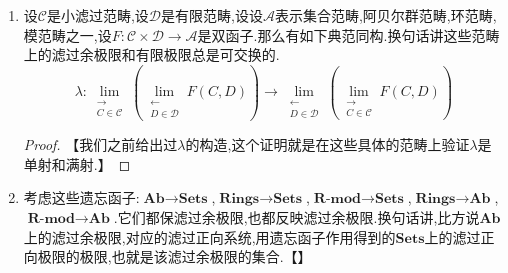 \begin{enumerate}
\begin{proof}
    	我们先来验证这里$\sim$的确是一个等价关系.首先自反性和对称性是容易的,下面解释传递性.设$(x_1\in F_1)\sim(x_2\in F_2)$和$(x_2\in F_2)\sim(x_3\in F_3)$.那么存在$\mathscr{I}$中的对象4和5,以及态射$f:1\to4$,$g:2t\to4$,$h:2\to5$,$k:3\to5$,使得有$Ff(x_1)=Fg(x_2)$和$Fh(x_2)=Fk(x_3)$.那么按照上述引理,存在余锥$\{\alpha_i:i\to6\mid 1\le i\le 5\}$,于是我们有如下交换图表:
    	$$\xymatrix{&&6&&\\&4\ar[ur]^{\alpha_4}&&5\ar[ul]_{\alpha_5}&\\1\ar[ur]^f&&2\ar[ul]^g\ar[ur]_h\ar[uu]_{\alpha_2}&&3\ar[ul]_k}$$
    	
    	于是有:
    	\begin{align*}
    		F\alpha_4\circ Ff(x_1)&=F\alpha_4\circ Fg(x_2)\\&=F\alpha_2(x_2)\\&=F\alpha_5\circ Fh(x_2)\\&=F\alpha_5\circ Fk(x_3)
    	\end{align*}
    
        这得到传递性.我们再验证$s_i$的确构成一个余锥.如果$f:i\to j$是$\mathscr{I}$中的态射,任取$x\in F_i$,那么有$Ff(x)=F(1_j)(Ff(x))$,这说明$[x]=[Ff(x)]$,也即$s_i$构成余锥.最后验证泛性质.设$\{t_i:F_i\to M\mid i\in\mathscr{I}\}$也是$F$的余锥.定义$t:L\to M$为$t([x])=t_i(x)$,这不依赖于$[x]$的代表元$x$的选取是因为,如果$[x_1]=[x_2]$,其中$x_1\in F_1$和$x_2\in F_2$,那么存在$\mathscr{I}$的对象3以及态射$f:1\to3$和$g:2\to3$使得$Ff(x_1)=Fg(x_2)$.进而有$t_1(x_1)=t_3\circ Ff(x_1)=t_3\circ Fg(x_2)=t_2(x_2)$.
    \end{proof}
    \item 设$\mathscr{C}$是小滤过范畴,设$\mathscr{D}$是有限范畴,设设$\mathscr{A}$表示集合范畴,阿贝尔群范畴,环范畴,模范畴之一,设$F:\mathscr{C}\times\mathscr{D}\to\mathscr{A}$是双函子.那么有如下典范同构.换句话讲这些范畴上的滤过余极限和有限极限总是可交换的.
    $$\lambda:\lim\limits_{\substack{\rightarrow\\C\in\mathscr{C}}}\left(\lim\limits_{\substack{\leftarrow\\D\in\mathscr{D}}}F(C,D)\right)\to\lim\limits_{\substack{\leftarrow\\D\in\mathscr{D}}}\left(\lim\limits_{\substack{\rightarrow\\C\in\mathscr{C}}}F(C,D)\right)$$
    \begin{proof}
    	
    	【我们之前给出过$\lambda$的构造,这个证明就是在这些具体的范畴上验证$\lambda$是单射和满射.】
    \end{proof}
    \item 考虑这些遗忘函子:$\textbf{Ab}\to\textbf{Sets}$,$\textbf{Rings}\to\textbf{Sets}$,$\textbf{R-mod}\to\textbf{Sets}$,$\textbf{Rings}\to\textbf{Ab}$,$\textbf{R-mod}\to\textbf{Ab}$.它们都保滤过余极限,也都反映滤过余极限.换句话讲,比方说$\textbf{Ab}$上的滤过余极限,对应的滤过正向系统,用遗忘函子作用得到的$\textbf{Sets}$上的滤过正向极限的极限,也就是该滤过余极限的集合.【】
\end{enumerate}
\newpage
